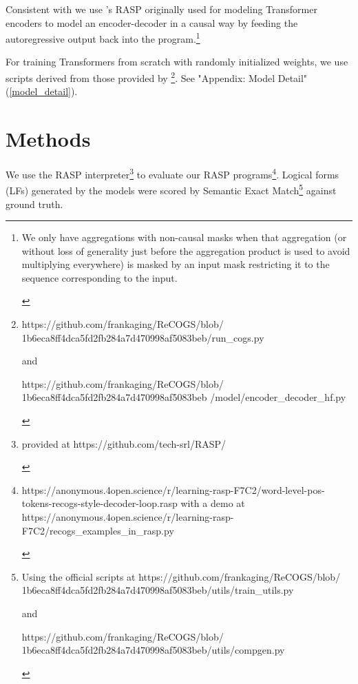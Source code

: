 \documentclass[11pt]{article}
\begin{document}
Consistent with \cite{Zhou2024} we use \cite{Weiss2021}'s RASP originally used for modeling Transformer encoders to model an encoder-decoder in a causal way by feeding the autoregressive output back into the program.\footnote{\begin{footnotesize}We only have aggregations with non-causal masks when that aggregation (or without loss of generality just before the aggregation product is used to avoid multiplying everywhere) is masked by an input mask restricting it to the sequence corresponding to the input.\end{footnotesize}}

For training Transformers from scratch with randomly initialized weights, we use scripts derived from those provided by \cite{Wu2023}\footnote{
\begin{footnotesize}https://github.com/frankaging/ReCOGS/blob/
1b6eca8ff4dca5fd2fb284a7d470998af5083beb/run\_cogs.py

and

https://github.com/frankaging/ReCOGS/blob/
1b6eca8ff4dca5fd2fb284a7d470998af5083beb
/model/encoder\_decoder\_hf.py 
\end{footnotesize}
}. See "Appendix: Model Detail" (\ref{model_detail}).
\section{Methods}
We use the RASP \cite{Weiss2021} interpreter\footnote{\begin{footnotesize}provided at https://github.com/tech-srl/RASP/
\end{footnotesize}
} to evaluate our RASP programs\footnote{\begin{footnotesize}https://anonymous.4open.science/r/learning-rasp-F7C2/word-level-pos-tokens-recogs-style-decoder-loop.rasp with a demo at https://anonymous.4open.science/r/learning-rasp-F7C2/recogs\_examples\_in\_rasp.py
\end{footnotesize}
}. Logical forms (LFs) generated by the models were scored by Semantic Exact Match\footnote{\begin{footnotesize}Using the official scripts at https://github.com/frankaging/ReCOGS/blob/
1b6eca8ff4dca5fd2fb284a7d470998af5083beb/utils/train\_utils.py

and

https://github.com/frankaging/ReCOGS/blob/
1b6eca8ff4dca5fd2fb284a7d470998af5083beb/utils/compgen.py
\end{footnotesize}
} against ground truth.
\end{document}
